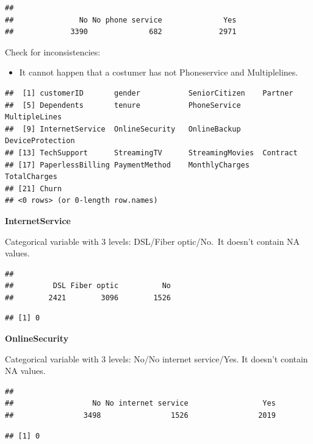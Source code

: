 \documentclass[
  twoside]{article}
\providecommand{\tightlist}{%
  \setlength{\itemsep}{0pt}\setlength{\parskip}{0pt}}
\begin{document}
\begin{verbatim}
## 
##               No No phone service              Yes 
##             3390              682             2971
\end{verbatim}

Check for inconsistencies:

\begin{itemize}
\tightlist
\item
  It cannot happen that a costumer has not Phoneservice and
  Multiplelines.
\end{itemize}

\begin{verbatim}
##  [1] customerID       gender           SeniorCitizen    Partner         
##  [5] Dependents       tenure           PhoneService     MultipleLines   
##  [9] InternetService  OnlineSecurity   OnlineBackup     DeviceProtection
## [13] TechSupport      StreamingTV      StreamingMovies  Contract        
## [17] PaperlessBilling PaymentMethod    MonthlyCharges   TotalCharges    
## [21] Churn           
## <0 rows> (or 0-length row.names)
\end{verbatim}

\textbf{InternetService}

Categorical variable with 3 levels: DSL/Fiber optic/No.~It doesn't
contain NA values.

\begin{verbatim}
## 
##         DSL Fiber optic          No 
##        2421        3096        1526
\end{verbatim}

\begin{verbatim}
## [1] 0
\end{verbatim}

\textbf{OnlineSecurity}

Categorical variable with 3 levels: No/No internet service/Yes. It
doesn't contain NA values.

\begin{verbatim}
## 
##                  No No internet service                 Yes 
##                3498                1526                2019
\end{verbatim}

\begin{verbatim}
## [1] 0
\end{verbatim}
\end{document}
